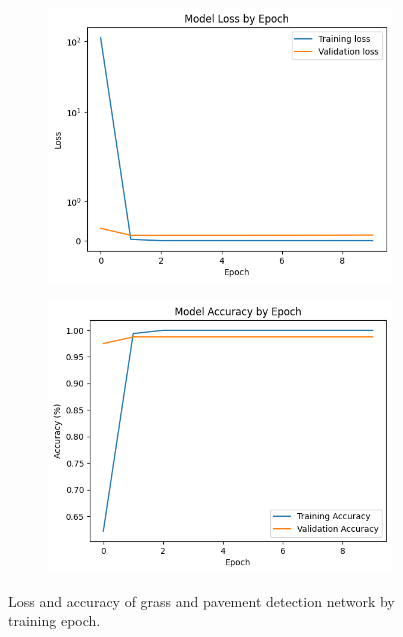\documentclass[titlepage, twocolumn]{article}
\begin{document}
            \begin{figure}
                \begin{center}
                    \begin{subfigure}{0.5\linewidth}
                        \centering
                        \includegraphics[width=\linewidth]{grasspaveloss.png}
                      \end{subfigure}%
                      \begin{subfigure}{0.5\linewidth}
                        \centering
                        \includegraphics[width=\linewidth]{grasspaveacc.png}
                      \end{subfigure}
                \end{center}
                \caption{Loss and accuracy of grass and pavement detection network by training epoch.}
                \label{fig:grasspavegraphs}
            \end{figure}
\end{document}
